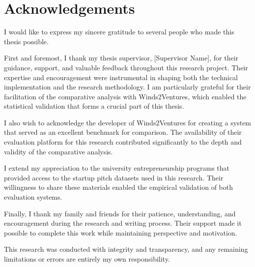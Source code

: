 \chapter*{Acknowledgements}
\label{ch:acknowledgements}

I would like to express my sincere gratitude to several people who made this thesis possible.

First and foremost, I thank my thesis supervisor, [Supervisor Name], for their guidance, support, and valuable feedback throughout this research project. Their expertise and encouragement were instrumental in shaping both the technical implementation and the research methodology. I am particularly grateful for their facilitation of the comparative analysis with Winds2Ventures, which enabled the statistical validation that forms a crucial part of this thesis.

I also wish to acknowledge the developer of Winds2Ventures for creating a system that served as an excellent benchmark for comparison. The availability of their evaluation platform for this research contributed significantly to the depth and validity of the comparative analysis.

I extend my appreciation to the university entrepreneurship programs that provided access to the startup pitch datasets used in this research. Their willingness to share these materials enabled the empirical validation of both evaluation systems.

Finally, I thank my family and friends for their patience, understanding, and encouragement during the research and writing process. Their support made it possible to complete this work while maintaining perspective and motivation.

This research was conducted with integrity and transparency, and any remaining limitations or errors are entirely my own responsibility.
